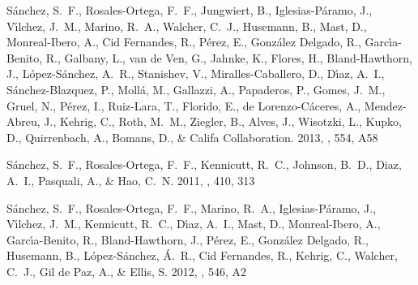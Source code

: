 \begin{thebibliography}
{S{\'a}nchez}, S.~F., {Rosales-Ortega}, F.~F., {Jungwiert}, B.,
  {Iglesias-P{\'a}ramo}, J., {V{\'{\i}}lchez}, J.~M., {Marino}, R.~A.,
  {Walcher}, C.~J., {Husemann}, B., {Mast}, D., {Monreal-Ibero}, A., {Cid
  Fernandes}, R., {P{\'e}rez}, E., {Gonz{\'a}lez Delgado}, R.,
  {Garc{\'{\i}}a-Benito}, R., {Galbany}, L., {van de Ven}, G., {Jahnke}, K.,
  {Flores}, H., {Bland-Hawthorn}, J., {L{\'o}pez-S{\'a}nchez}, A.~R.,
  {Stanishev}, V., {Miralles-Caballero}, D., {D{\'{\i}}az}, A.~I.,
  {S{\'a}nchez-Blazquez}, P., {Moll{\'a}}, M., {Gallazzi}, A., {Papaderos}, P.,
  {Gomes}, J.~M., {Gruel}, N., {P{\'e}rez}, I., {Ruiz-Lara}, T., {Florido}, E.,
  {de Lorenzo-C{\'a}ceres}, A., {Mendez-Abreu}, J., {Kehrig}, C., {Roth},
  M.~M., {Ziegler}, B., {Alves}, J., {Wisotzki}, L., {Kupko}, D.,
  {Quirrenbach}, A., {Bomans}, D., \& {Califa Collaboration}. 2013, \aap, 554,
  A58


{S{\'a}nchez}, S.~F., {Rosales-Ortega}, F.~F., {Kennicutt}, R.~C., {Johnson},
  B.~D., {Diaz}, A.~I., {Pasquali}, A., \& {Hao}, C.~N. 2011, \mnras, 410, 313


{S{\'a}nchez}, S.~F., {Rosales-Ortega}, F.~F., {Marino}, R.~A.,
  {Iglesias-P{\'a}ramo}, J., {V{\'{\i}}lchez}, J.~M., {Kennicutt}, R.~C.,
  {D{\'{\i}}az}, A.~I., {Mast}, D., {Monreal-Ibero}, A.,
  {Garc{\'{\i}}a-Benito}, R., {Bland-Hawthorn}, J., {P{\'e}rez}, E.,
  {Gonz{\'a}lez Delgado}, R., {Husemann}, B., {L{\'o}pez-S{\'a}nchez},
  {\'A}.~R., {Cid Fernandes}, R., {Kehrig}, C., {Walcher}, C.~J., {Gil de Paz},
  A., \& {Ellis}, S. 2012{}, \aap, 546, A2



\end{thebibliography}
